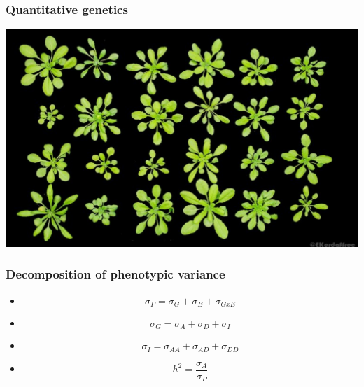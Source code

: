 \documentclass{beamer}
\begin{document}
\begin{frame}
    \frametitle{Quantitative genetics}
    \includegraphics[width=.98\textwidth, height=.8\textheight]{../Figures/athal.png}
\end{frame}



\begin{frame}
  \begin{huge}
    \frametitle{Decomposition of phenotypic variance} \vspace{-2ex}
    \begin{itemize}[<+->]
    \item[] \[\sigma_P = \sigma_G + \sigma_E + \sigma_{GxE}\]
    \item[] \[\sigma_G = \sigma_A + \sigma_D + \sigma_I\]
    \item[] \[\sigma_I = \sigma_{AA} + \sigma_{AD} + \sigma_{DD}\]
    \item[] \[h^2 = \frac{\sigma_A}{\sigma_P} \]
    \end{itemize}
  \end{huge}
\end{frame}
 
\end{document}

